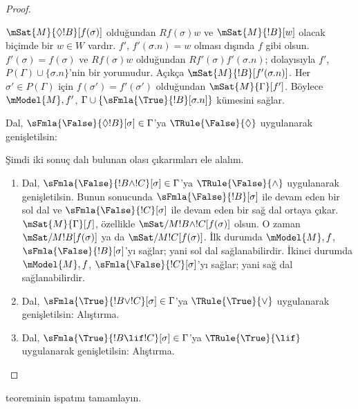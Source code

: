 \documentclass[../../../include/open-logic-section]{subfiles}
\begin{document}
\begin{proof}
\begin{enumerate}
{{  $\mSat{M}{\Diamond !B}[f(\sigma)]$ olduğundan $Rf(\sigma)w$ ve
  $\mSat{M}{!B}[w]$ olacak biçimde bir $w \in W$ vardır. $f'$,
  $f'(\sigma.n)=w$ olması dışında $f$ gibi olsun. $f'(\sigma)=f(\sigma)$ ve
  $Rf(\sigma)w$ olduğundan $Rf'(\sigma)f'(\sigma.n)$; dolayısıyla $f'$,
  $P(\Gamma) \cup \{\sigma.n\}$'nin bir yorumudur. Açıkça
  $\mSat{M}{!B}[f'(\sigma.n)]$. Her $\sigma' \in P(\Gamma)$ için
  $f(\sigma')=f'(\sigma')$ olduğundan $\mSat{M}{\Gamma}[f']$. Böylece
  $\mModel{M},f'$, $\Gamma \cup
  \{\sFmla{\True}{!B}[\sigma.n]\}$ kümesini sağlar.}
\item Dal, $\sFmla{\False}{\Diamond !B}[\sigma] \in \Gamma$'ya
  $\TRule{\False}{\Diamond}$ uygulanarak genişletilsin:
  }{}
\end{enumerate}
Şimdi iki sonuç dalı bulunan olası çıkarımları ele alalım.
\begin{enumerate}
\item Dal, $\sFmla{\False}{!B \land !C}[\sigma] \in \Gamma$'ya
  $\TRule{\False}{\land}$ uygulanarak genişletilsin. Bunun sonucunda
  $\sFmla{\False}{!B}[\sigma]$ ile devam eden bir sol dal ve
  $\sFmla{\False}{!C}[\sigma]$ ile devam eden bir sağ dal ortaya çıkar.
  $\mSat{M}{\Gamma}[f]$, özellikle
  $\mSat/{M}{!B \land !C}[f(\sigma)]$ olsun. O zaman
  $\mSat/{M}{!B}[f(\sigma)]$ ya da $\mSat/{M}{!C}[f(\sigma)]$. İlk durumda
  $\mModel{M},f$, $\sFmla{\False}{!B}[\sigma]$'yı sağlar; yani sol dal
  sağlanabilirdir. İkinci durumda $\mModel{M},f$,
  $\sFmla{\False}{!C}[\sigma]$'yı sağlar; yani sağ dal sağlanabilirdir.
\item Dal, $\sFmla{\True}{!B \lor !C}[\sigma] \in \Gamma$'ya
    $\TRule{\True}{\lor}$ uygulanarak genişletilsin: Alıştırma.
\item Dal, $\sFmla{\True}{!B \lif !C}[\sigma] \in \Gamma$'ya
    $\TRule{\True}{\lif}$ uygulanarak genişletilsin: Alıştırma.
\end{enumerate}
\end{proof}

\begin{prob}
 teoreminin ispatını tamamlayın.
\end{prob}
\end{document}
